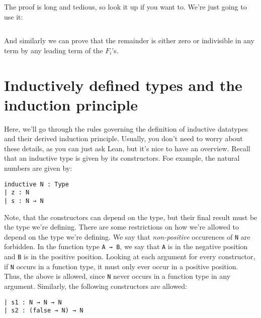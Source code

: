 \documentclass[a4paper, 12pt]{article}
\newcommand{\lean}[1]{\texttt{#1}}
\theoremstyle{changedot}
\theoremstyle{changedotbreak}
\theoremstyle{nonumberplain}
\begin{document}
The proof is long and tedious, so look it up if you want to. We're just going to use it:

\inputminted[firstline=357, lastline=386]{lean}{../src/mv_division.lean}

And similarly we can prove that the remainder is either zero or indivisible in any term by any leading term of the $F_{i}$'s.































\printbibliography


\appendix
\section{Inductively defined types and the induction principle}\label{sec:ind}
Here, we'll go through the rules governing the definition of inductive datatypes and their derived induction principle. Usually, you don't need to worry about these details, as you can just ask Lean, but it's nice to have an overview. Recall that an inductive type is given by its constructors. Foe example, the natural numbers are given by:

\begin{verbatim}
inductive N : Type
| z : N
| s : N → N 
\end{verbatim}

Note, that the constructors can depend on the type, but their final result must be the type we're defining. There are some restrictions on how we're allowed to depend on the type we're defining. We say that \textit{non-positive} occurences of \lean{N} are forbidden. In the function type \lean{A → B}, we say that \lean{A} is in the negative position and \lean{B} is in the positive position. Looking at each argument for every constructor, if \lean{N} occurs in a function type, it must only ever occur in a positive position. Thus, the above is allowed, since \lean{N} never occurs in a function type in any argument. Similarly, the following constructors are allowed:
\begin{verbatim}
| s1 : N → N → N
| s2 : (false → N) → N
\end{verbatim}
\end{document}
